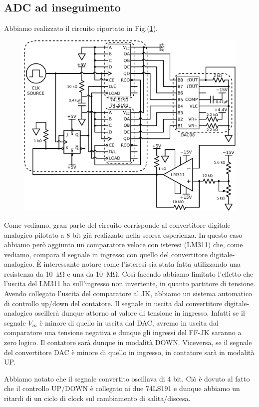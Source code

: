 \subsection{ADC ad inseguimento}
Abbiamo realizzato il circuito riportato in Fig.(\ref{cir13:ADC}).

\begin{figure}[htpc]
\centering
	\includegraphics[width=.73\textwidth]{../E13/latex/ADC.pdf}
	\caption{}
	\label{cir13:ADC}
\end{figure}

Come vediamo, gran parte del circuito corrisponde al convertitore digitale-analogico pilotato a 8 bit già realizzato nella scorsa esperienza. In questo caso abbiamo però aggiunto un comparatore veloce con isteresi (LM311) che, come vediamo, compara il segnale in ingresso con quello del convertitore digitale-analogico. È interessante notare come l'isteresi sia stata fatta utilizzando una resistenza da \SI{10}{\kilo\ohm} e una da \SI{10}{\mega\ohm}. Così facendo abbiamo limitato l'effetto che l'uscita del LM311 ha sull'ingresso non invertente, in quanto partitore di tensione. Avendo collegato l'uscita del comparatore al JK, abbiamo un sistema automatico di controllo up/down del contatore. Il segnale in uscita dal convertitore digitale-analogico oscillerà dunque attorno al valore di tensione in ingresso. Infatti se il segnale $V_{in}$ è minore di quello in uscita dal DAC, avremo in uscita dal comparatore una tensione negativa e dunque gli ingressi del FF-JK saranno a zero logico. Il contatore sarà  dunque in modalità DOWN. Viceversa, se il segnale del convertitore DAC è minore di quello in ingresso, in contatore sarà in modalità UP. 

Abbiamo notato che il segnale convertito oscillava di 4 bit. Ciò è dovuto al fatto che il controllo UP/DOWN è collegato ai due 74LS191 e dunque abbiamo un ritardi di un ciclo di clock sul cambiamento di salita/discesa.

